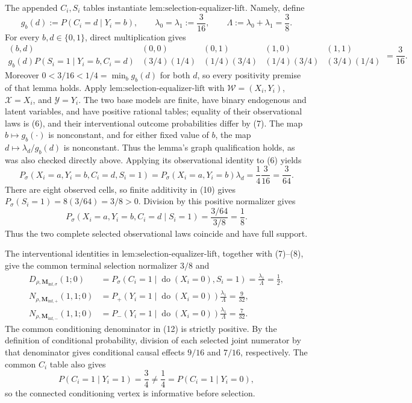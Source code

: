 The appended \(C_i,S_i\) tables instantiate \(\text{lem:selection-equalizer-lift}\).  Namely, define
\[
 g_b(d):=P(C_i=d\mid Y_i=b),
 \qquad \lambda_0=\lambda_1:=\frac3{16},
 \qquad \Lambda:=\lambda_0+\lambda_1=\frac38.          \tag{8}
\]
For every \(b,d\in\{0,1\}\), direct multiplication gives
\[
\begin{array}{c|cccc}
 (b,d)&(0,0)&(0,1)&(1,0)&(1,1)\\ \hline
 g_b(d)P(S_i=1\mid Y_i=b,C_i=d)
 &(3/4)(1/4)&(1/4)(3/4)&(1/4)(3/4)&(3/4)(1/4)
\end{array}
=\frac3{16}.                                             \tag{9}
\]
Moreover \(0<3/16<1/4=\min_b g_b(d)\) for both \(d\), so every positivity premise of that lemma holds.  Apply \(\text{lem:selection-equalizer-lift}\) with \(\mathcal W=(X_i,Y_i)\), \(\mathcal X=X_i\), and \(\mathcal Y=Y_i\).  The two base models are finite, have binary endogenous and latent variables, and have positive rational tables; equality of their observational laws is (6), and their interventional outcome probabilities differ by (7).  The map \(b\mapsto g_b(\cdot)\) is nonconstant, and for either fixed value of \(b\), the map \(d\mapsto\lambda_d/g_b(d)\) is nonconstant.  Thus the lemma's graph qualification holds, as was also checked directly above.  Applying its observational identity to (6) yields
\[
 P_\sigma(X_i=a,Y_i=b,C_i=d,S_i=1)
 =P_\sigma(X_i=a,Y_i=b)\lambda_d
 =\frac14\frac3{16}=\frac3{64}.                         \tag{10}
\]
There are eight observed cells, so finite additivity in (10) gives \(P_\sigma(S_i=1)=8(3/64)=3/8>0\).  Division by this positive normalizer gives
\[
 P_\sigma(X_i=a,Y_i=b,C_i=d\mid S_i=1)
 =\frac{3/64}{3/8}=\frac18.                              \tag{11}
\]
Thus the two complete selected observational laws coincide and have full support.

The interventional identities in \(\text{lem:selection-equalizer-lift}\), together with (7)--(8), give the common terminal selection normalizer \(3/8\) and
\[
\begin{aligned}
 D_{\rho,\mathbf M_{\mathrm{inf},\sigma}}(1;0)
 &=P_\sigma(C_i=1\mid\operatorname{do}(X_i=0),S_i=1)
   =\frac{\lambda_1}{\Lambda}=\frac12,\\
 N_{\rho,\mathbf M_{\mathrm{inf},+}}(1,1;0)
 &=P_+(Y_i=1\mid\operatorname{do}(X_i=0))
   \frac{\lambda_1}{\Lambda}=\frac9{32},\\
 N_{\rho,\mathbf M_{\mathrm{inf},-}}(1,1;0)
 &=P_-(Y_i=1\mid\operatorname{do}(X_i=0))
   \frac{\lambda_1}{\Lambda}=\frac7{32}.              \tag{12}
\end{aligned}
\]
The common conditioning denominator in (12) is strictly positive.  By the definition of conditional probability, division of each selected joint numerator by that denominator gives conditional causal effects \(9/16\) and \(7/16\), respectively.  The common \(C_i\) table also gives
\[
 P(C_i=1\mid Y_i=1)=\frac34\ne\frac14
 =P(C_i=1\mid Y_i=0),                                   \tag{13}
\]
so the connected conditioning vertex is informative before selection.

